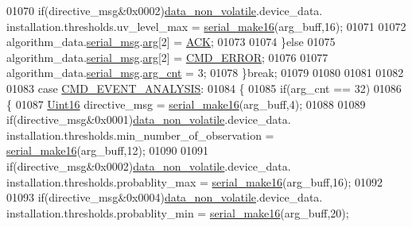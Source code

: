 \begin{DoxyCode}
{{{{{01070                             \textcolor{keywordflow}{if}(directive\_msg&0x0002)\hyperlink{a00060_a76ac5f917f5308dcd83de0d7c94559fb}{data\_non\_volatile}.device\_data.
      installation.thresholds.uv\_level\_max = \hyperlink{a00031_abc17de32f14103a5be219df0d4ad9176}{serial\_make16}(arg\_buff,16);
01071                             
01072                             algorithm\_data.\hyperlink{a00016_afcf5f557aea688aad985eec15269c1da}{serial\_msg}.\hyperlink{a00031_af7d6f762438c80072bd9dc0e4dd4ae1e}{arg}[2] = \hyperlink{a00021_a6f6489887e08bff4887d0bc5dcf214d8}{ACK};
01073                           
01074                           \}\textcolor{keywordflow}{else}
01075                              algorithm\_data.\hyperlink{a00016_afcf5f557aea688aad985eec15269c1da}{serial\_msg}.\hyperlink{a00031_af7d6f762438c80072bd9dc0e4dd4ae1e}{arg}[2] = 
      \hyperlink{a00021_a1764a522e9c1a59a59be8757c69fa494}{CMD\_ERROR};
01076 
01077                              algorithm\_data.\hyperlink{a00016_afcf5f557aea688aad985eec15269c1da}{serial\_msg}.\hyperlink{a00031_a7b79f40e2eeec288091afd340bf8f591}{arg\_cnt} = 3;
01078                 \}\textcolor{keywordflow}{break};
01079 
01080 
01081 
01082 
01083                 \textcolor{keywordflow}{case}  \hyperlink{a00021_a3a15793e3ab7817f2429edf04de693a0}{CMD\_EVENT\_ANALYSIS}:
01084                 \{
01085                           \textcolor{keywordflow}{if}(arg\_cnt == 32)
01086                           \{
01087                              \hyperlink{a00072_a59a9f6be4562c327cbfb4f7e8e18f08b}{Uint16} directive\_msg =  \hyperlink{a00031_abc17de32f14103a5be219df0d4ad9176}{serial\_make16}(arg\_buff,4);
01088                           
01089                              \textcolor{keywordflow}{if}(directive\_msg&0x0001)\hyperlink{a00060_a76ac5f917f5308dcd83de0d7c94559fb}{data\_non\_volatile}.device\_data.
      installation.thresholds.min\_number\_of\_observation = \hyperlink{a00031_abc17de32f14103a5be219df0d4ad9176}{serial\_make16}(arg\_buff,12);
01090                           
01091                              \textcolor{keywordflow}{if}(directive\_msg&0x0002)\hyperlink{a00060_a76ac5f917f5308dcd83de0d7c94559fb}{data\_non\_volatile}.device\_data.
      installation.thresholds.probablity\_max            = \hyperlink{a00031_abc17de32f14103a5be219df0d4ad9176}{serial\_make16}(arg\_buff,16);
01092                           
01093                              \textcolor{keywordflow}{if}(directive\_msg&0x0004)\hyperlink{a00060_a76ac5f917f5308dcd83de0d7c94559fb}{data\_non\_volatile}.device\_data.
      installation.thresholds.probablity\_min            = \hyperlink{a00031_abc17de32f14103a5be219df0d4ad9176}{serial\_make16}(arg\_buff,20);
}}}}}
\end{DoxyCode}

